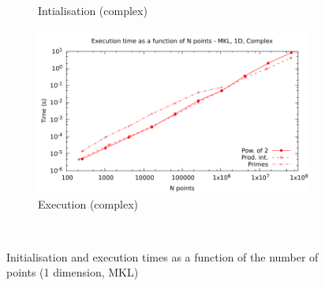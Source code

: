 \documentclass[12pt, a4paper]{article}
\begin{document}
\begin{figure}[H]
\begin{subfigure}{.5\textwidth}
\caption{Intialisation (complex)}
\label{1DMKLCI}
\end{subfigure}%
\begin{subfigure}{.5\textwidth}
\centering
\includegraphics[width=.9\linewidth]{graphs/1d-mkl-exec-c.pdf}
\caption{Execution (complex)}
\label{1DMKLC}
\end{subfigure}\\
\caption{Initialisation and execution times as a function of the number of points (1 dimension, MKL)}
\label{1DMKL}
\end{figure}
\end{document}
